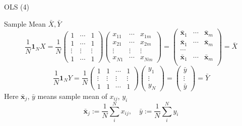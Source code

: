 \documentclass[final]{beamer}
\newcommand{\bd}{\mathbf}
\begin{document}
\begin{frame}[t]{OLS (4)}
	\begin{block}
		{Sample Mean $\bar X, \bar Y$}
		\[
			\frac{1}{N}\bd{1}_N X = \frac{1}{N}\begin{pmatrix}
				1  & \cdots & 1\\
				1  & \cdots & 1\\
				\vdots & \vdots & \vdots\\
				1 & \cdots & 1
			\end{pmatrix}\begin{pmatrix}
			x_{11} & \cdots & x_{1m}\\
			x_{21} & \cdots & x_{2m}\\
			\vdots & \vdots & \vdots\\
			x_{N1} & \cdots & x_{Nm}
		\end{pmatrix} = \begin{pmatrix}
			\bar{\bd{x}}_1 & \cdots & \bar{\bd{x}}_m\\
			\bar{\bd{x}}_1 & \cdots & \bar{\bd{x}}_m\\
			\cdots\\
			\bar{\bd{x}}_1 & \cdots & \bar{\bd{x}}_m\\
		\end{pmatrix}= \bar{X}
		\]
		\[
			\frac{1}{N}\bd{1}_N Y = \frac{1}{N}\begin{pmatrix}
				1 & 1 & \cdots & 1\\
				\vdots & \vdots & \vdots & \vdots\\
				1 & 1 & \cdots & 1
			\end{pmatrix}\begin{pmatrix}
			y_1 \\
			\vdots\\
			y_N
		\end{pmatrix} = \begin{pmatrix}
			\bar{y}\\
			\vdots\\
			\bar{y}
		\end{pmatrix}=\bar{Y}
		\]
		Here $\bar{\bd{x}}_j$, $\bar{y}$ means sample mean of $x_{ij}$, $y_i$\[
			\bar{\bd{x}}_j := \frac{1}{N}\sum_i^N x_{ij}, \quad \bar{y}:=\frac{1}{N}\sum_i^N {y_i}
		\]
	\end{block}
\end{frame}
\end{document}
